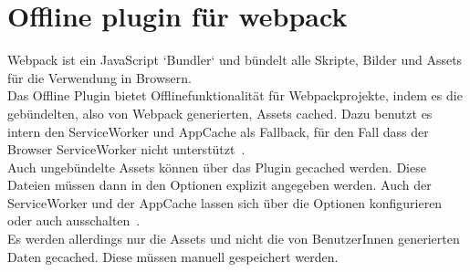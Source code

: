 \section{Offline plugin für webpack}
Webpack ist ein JavaScript `Bundler` und bündelt alle Skripte, Bilder und \gls{Assets} für die Verwendung in Browsern.\\
Das Offline Plugin bietet Offlinefunktionalität für Webpackprojekte, indem es die gebündelten, also von Webpack generierten, \gls{Assets} cached.
Dazu benutzt es intern den ServiceWorker und AppCache als Fallback, für den Fall dass der Browser ServiceWorker nicht unterstützt~\cite{webpack-gh}.\\
Auch ungebündelte \gls{Assets} können über das Plugin gecached werden. Diese Dateien müssen dann in den Optionen explizit angegeben werden. Auch der ServiceWorker und der AppCache lassen sich über die Optionen konfigurieren oder auch ausschalten~\cite{webpack-opt}.\\
Es werden allerdings nur die \gls{Assets} und nicht die von BenutzerInnen generierten Daten gecached. Diese müssen manuell gespeichert werden.